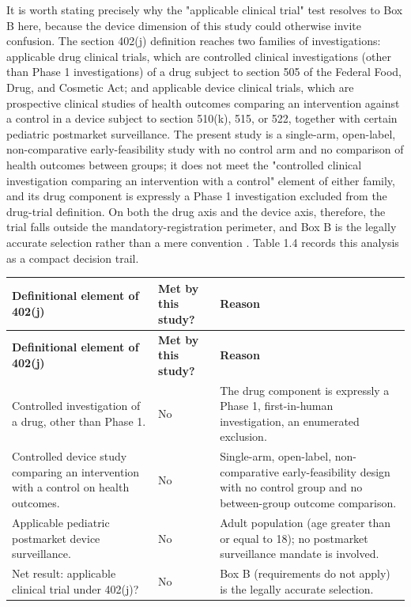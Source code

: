 It is worth stating precisely why the "applicable clinical trial" test
resolves to Box B here, because the device dimension of this study could
otherwise invite confusion. The section 402(j) definition reaches two
families of investigations: applicable drug clinical trials, which are
controlled clinical investigations (other than Phase 1 investigations) of
a drug subject to section 505 of the Federal Food, Drug, and Cosmetic Act;
and applicable device clinical trials, which are prospective clinical
studies of health outcomes comparing an intervention against a control in
a device subject to section 510(k), 515, or 522, together with certain
pediatric postmarket surveillance. The present study is a single-arm,
open-label, non-comparative early-feasibility study with no control arm
and no comparison of health outcomes between groups; it does not meet the
"controlled clinical investigation comparing an intervention with a
control" element of either family, and its drug component is expressly a
Phase 1 investigation excluded from the drug-trial definition. On both the
drug axis and the device axis, therefore, the trial falls outside the
mandatory-registration perimeter, and Box B is the legally accurate
selection rather than a mere convention \cite{phase1guidance,
clintrustpai}. Table 1.4 records this analysis as a compact decision
trail.

\begin{center}
\begin{xltabular}{\textwidth}{>{\raggedright\arraybackslash}p{4.4cm} >{\raggedright\arraybackslash}p{2.6cm} Y}
\toprule
\textbf{Definitional element of 402(j)} & \textbf{Met by this study?} & \textbf{Reason} \\
\midrule
\endfirsthead
\toprule
\textbf{Definitional element of 402(j)} & \textbf{Met by this study?} & \textbf{Reason} \\
\midrule
\endhead
\bottomrule
\endfoot
Controlled investigation of a drug, other than Phase 1. & No & The drug component is expressly a Phase 1, first-in-human investigation, an enumerated exclusion. \\
Controlled device study comparing an intervention with a control on health outcomes. & No & Single-arm, open-label, non-comparative early-feasibility design with no control group and no between-group outcome comparison. \\
Applicable pediatric postmarket device surveillance. & No & Adult population (age greater than or equal to 18); no postmarket surveillance mandate is involved. \\
Net result: applicable clinical trial under 402(j)? & No & Box B (requirements do not apply) is the legally accurate selection. \\
\bottomrule
\end{xltabular}
\end{center}

